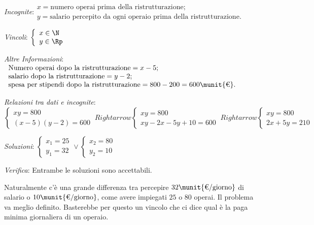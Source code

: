 \emph{Incognite}:\( \begin{array}{l}
x =\text{numero operai prima della ristrutturazione};\\
y= \text{salario percepito da ogni operaio prima della ristrutturazione}.
\end{array}\)

\emph{Vincoli}: \(\left\{\begin{array}{l}x\in \N\\y\in 
\Rp\end{array}\right.\)

\emph{Altre Informazioni}: \( \begin{array}{l}
\text{Numero operai dopo la ristrutturazione} = x-5;\\
\text{salario dopo la ristrutturazione} =y-2;\\
\text{spesa per stipendi dopo la ristrutturazione} 
=800-200=600\munit{\text{€}}.\end{array}\)

\emph{Relazioni tra dati e incognite}:
\begin{equation*}
\left\{\begin{array}{l}{{xy}=800}\\{(x-5)(y-2)=600}\end{array}\right.\
Rightarrow 
\left\{\begin{array}{l}{{xy}=800}\\{{xy}-2x-5y+10=600}\end{array}\right.\
Rightarrow \left\{\begin{array}{l}{{xy}=800}\\{2x+5y=210}\end{array}\right.
\end{equation*}

\emph{Soluzioni}: 
\(\left\{\begin{array}{l}{x_1=25}\\{y_1=32}\end{array}\right.\vee 
\left\{\begin{array}{l}{x_2=80}\\{y_2=10}\end{array}\right.\)

\emph{Verifica}: Entrambe le soluzioni sono accettabili.

Naturalmente c'è una grande differenza tra percepire 
\(32\munit{\text{€/giorno}}\) di salario o \( 10\munit{\text{€/giorno}} \), come 
avere impiegati \( 25 \) o \( 80 \) operai. Il problema va meglio definito. 
Basterebbe per questo un vincolo che ci dice qual è la paga minima giornaliera 
di un operaio.

